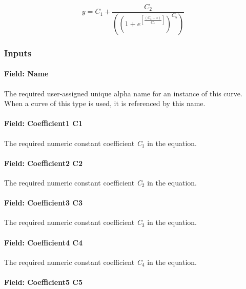 \begin{equation}
y = {C_1} + \frac{{{C_2}}}{{\left( {{{(1 + {e^{\left[ {\frac{{({C_3} - x)}}{{{C_4}}}} \right]}})}^{{C_5}}}} \right)}}
\end{equation}

\subsubsection{Inputs}\label{inputs-14-008}

\paragraph{Field: Name}\label{field-name-14-005}

The required user-assigned unique alpha name for an instance of this curve. When a curve of this type is used, it is referenced by this name.

\paragraph{Field: Coefficient1 C1}\label{field-coefficient1-c1-1}

The required numeric constant coefficient \emph{C\(_{1}\)} in the equation.

\paragraph{Field: Coefficient2 C2}\label{field-coefficient2-c2-1}

The required numeric constant coefficient \emph{C\(_{2}\)} in the equation.

\paragraph{Field: Coefficient3 C3}\label{field-coefficient3-c3-1}

The required numeric constant coefficient \emph{C\(_{3}\)} in the equation.

\paragraph{Field: Coefficient4 C4}\label{field-coefficient4-c4-1}

The required numeric constant coefficient \emph{C\(_{4}\)} in the equation.

\paragraph{Field: Coefficient5 C5}\label{field-coefficient5-c5}

